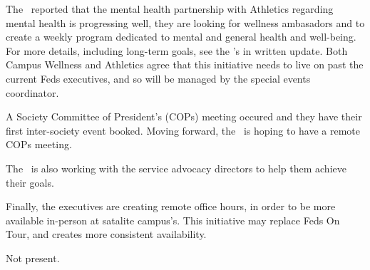 \begin{information}

    The \vpi\ reported that the mental health partnership with Athletics
    regarding mental health is progressing well, they are looking for wellness
    ambasadors and to create a weekly program dedicated to mental and general
    health and well-being.  For more details, including long-term goals, see
    the \vpi's in written update. Both Campus Wellness and Athletics agree that
    this initiative needs to live on past the current Feds executives, and so
    will be managed by the special events coordinator.

    A Society Committee of President's (COPs) meeting occured and they have
    their first inter-society event booked. Moving forward, the \vpi\ is hoping
    to have a remote COPs meeting. 
    
    The \vpi\ is also working with the service advocacy directors to help them
    achieve their goals.

    Finally, the executives are creating remote office hours, in order to be 
    more available in-person at satalite campus's. This initiative may replace 
    Feds On Tour, and creates more consistent availability.
    
\end{information}

\begin{information}
    Not present.
\end{information}

